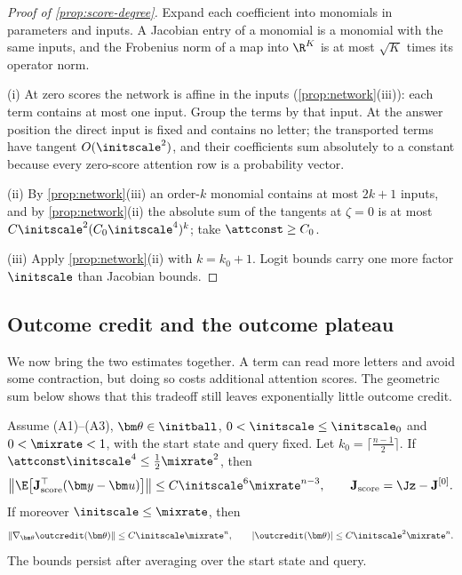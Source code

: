\begin{proof}[Proof of \cref{prop:score-degree}]
Expand each coefficient into monomials in parameters and inputs. A Jacobian entry of a monomial is a monomial with the same inputs, and the
Frobenius norm of a map into $\R^K$ is at most $\sqrt K$ times its operator norm.

\noindent(i) At zero scores the network is affine in the inputs (\cref{prop:network}(iii)): each term contains at most one input. Group the terms by
that input. At the answer position the direct input is fixed and contains no letter; the transported terms have tangent $O(\initscale^2)$, and
their coefficients sum absolutely to a constant because every zero-score attention row is a probability vector.

\noindent(ii) By \cref{prop:network}(iii) an order-$k$ monomial contains at most $2k+1$ inputs, and by \cref{prop:network}(ii) the absolute sum of the
tangents at $\zeta=0$ is at most $C\initscale^2(C_0\initscale^4)^k$; take $\attconst\ge C_0$.

\noindent(iii) Apply \cref{prop:network}(ii) with $k=k_0+1$. Logit bounds carry one more factor $\initscale$ than Jacobian bounds.
\end{proof}

\subsection{Outcome credit and the outcome plateau}
\label{app:thm1}

We now bring the two estimates together. A term can read more letters and avoid some contraction, but doing so costs additional
attention scores. The geometric sum below shows that this tradeoff still leaves exponentially little outcome credit.

\begin{lemma}
\label{lem:score-sum}
Assume (A1)--(A3), $\bm\theta\in\initball$, $0<\initscale\le\initscale_0$ and $0<\mixrate<1$, with the start state and query fixed. Let
$k_0=\lceil\frac{n-1}{2}\rceil$. If $\attconst\initscale^4\le\frac{1}{2}\mixrate^2$, then
\[
 \bigl\|\E\bigl[\mathbf J_{\mathrm{score}}^\top(\bm y-\bm u)\bigr]\bigr\|\le C\initscale^6\mixrate^{n-3},\qquad \mathbf J_{\mathrm{score}}=\Jz-\mathbf J^{[0]}.
\]
If moreover $\initscale\le\mixrate$, then
\begin{equation}
 \|\nabla_{\bm\theta}\outcredit(\bm\theta)\|\le C\initscale\mixrate^n,\qquad |\outcredit(\bm\theta)|\le C\initscale^2\mixrate^n.
 \label{eq:thm1-full}
\end{equation}
The bounds persist after averaging over the start state and query.
\end{lemma}

